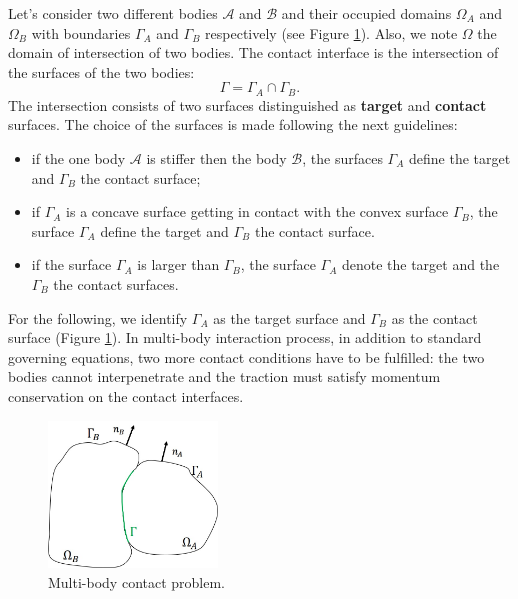 Let's consider two different bodies $\mathcal{A}$ and $\mathcal{B}$ and their occupied domains $\Omega_A$ and $\Omega_B$ with boundaries $\Gamma_A$ and $\Gamma_B$ respectively (see Figure \ref{contact_bodies}). Also, we note $\Omega$ the domain of intersection of two bodies. The contact interface is the intersection of the surfaces of the two bodies:
$$\Gamma = \Gamma_A \cap \Gamma_B.$$
The intersection consists of two surfaces distinguished as \textbf{target} and \textbf{contact} surfaces. The choice of the surfaces is made following the next guidelines:
\begin{itemize}
\item if the one body $\mathcal{A}$ is stiffer then the body $\mathcal{B}$, the surfaces $\Gamma_A$ define the target and $\Gamma_B$ the contact surface;
\item if $\Gamma_A$ is a concave surface getting in contact with the convex surface $\Gamma_B$, the surface $\Gamma_A$ define the target and $\Gamma_B$ the contact surface.
\item if the surface $\Gamma_A$ is larger than $\Gamma_B$, the surface $\Gamma_A$ denote the target and the $\Gamma_B$ the contact surfaces.
\end{itemize} 
For the following, we identify $\Gamma_A$ as the target surface and $\Gamma_B$ as the contact surface (Figure \ref{contact_bodies}).
 In multi-body interaction process, in addition to standard governing equations, two more contact conditions have to be fulfilled: the two bodies cannot interpenetrate and the traction must satisfy momentum conservation on the contact interfaces.
   

 \begin{center}
\begin{figure}
\centerline{\includegraphics[width=0.4\textwidth,keepaspectratio]{figures/contact_bodies.jpg} }
\caption{Multi-body contact problem.}
\label{contact_bodies}
\end{figure}
\end{center} 
   
